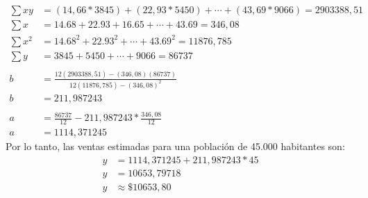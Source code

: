 \documentclass{templateNote}
\begin{document}
\begin{tcolorbox}[colback=red!5!white,colframe=blue!75!black]
    \begin{align*}
        \sum xy &= (14,66*3845) + (22,93*5450) + \cdots + (43,69 * 9066) = 2903388,51 \\
        \sum x &= 14.68+22.93+16.65+\cdots+43.69 = 346,08 \\
        \sum x^2 &= 14.68^2 + 22.93^2 + \cdots + 43.69^2 = 11876,785 \\
        \sum y &= 3845+5450+\cdots+9066 = 86737 \\
        \\
        b &= \frac{12(2903388,51)- (346,08)(86737)}{12(11876,785) - (346,08)^2}\\
        b &= 211,987243\\
        \\
        a &= \frac{86737}{12} - 211,987243 * \frac{346,08}{12} \\
        a &= 1114,371245
    \end{align*}
    Por lo tanto, las ventas estimadas para una población de 45.000 habitantes son:
    \begin{align*}
        y &= 1114,371245 + 211,987243 * 45 \\
        y &= 10653,79718 \\
        y &\approx \$10653,80
    \end{align*}   
\end{tcolorbox}
\end{document}
